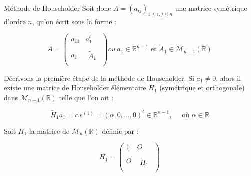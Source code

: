 \documentclass[french, 10pt]{beamer}
\theoremstyle{definition}
\begin{document}
\begin{frame}{Méthode de Householder}
	Soit donc $A=\left(a_{i j}\right)_{1 \leq i, j \leq n}$ une matrice symétrique d'ordre $n$, qu'on écrit sous la forme :
	
	$$
	A =
	\left(
	\begin{array}{c|c}
		a_{11} & a_1^t \\  
		\hline 
		a_1 & \begin{array}{c} \quad \\ \widetilde{A}_1 \\ \quad \end{array}
	\end{array}
	\right) { ou}\ a_1 \in \mathbb{R}^{n-1} \text { et } \tilde{A}_1 \in \mathcal{M}_{n-1}(\mathbb{R})
	$$
	
	
	Décrivons la première étape de la méthode de Householder.
	Si $a_1 \neq 0$, alors il existe une matrice de Householder élémentaire $\widetilde{H}_1$ (symétrique et orthogonale) dans $\mathcal{M}_{n-1}(\mathbb{R})$ telle que l'on ait :
	
	$$
	\tilde{H}_1 a_1=\alpha e^{(1)}=(\alpha, 0, \ldots, 0)^t \in \mathbb{R}^{n-1}, \quad \text { où } \alpha \in \mathbb{R}
	$$
	
	Soit $H_1$ la matrice de $\mathcal{M}_n(\mathbb{R})$ définie par :
	
	$$
	H_1 =
	\left(
	\begin{array}{c|c}
		1 & O \\  
		\hline O & \begin{array}{c} \quad \\ \tilde{H}_1 \\ \quad \end{array}
	\end{array}
	\right)
	$$
	
\end{frame}
\end{document}
